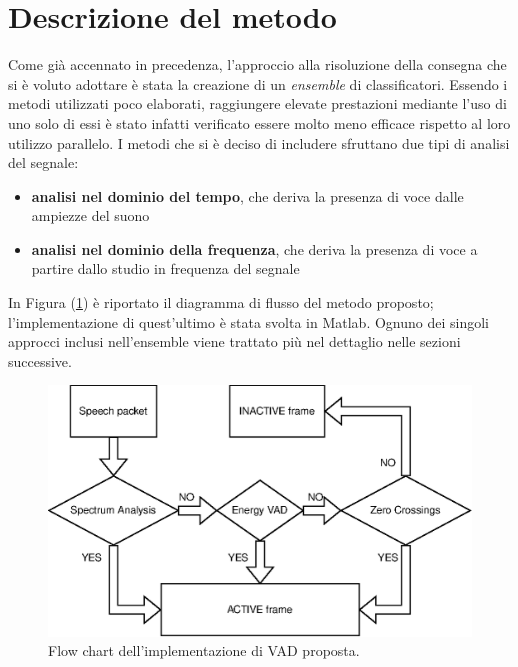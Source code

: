 \documentclass[10pt,twocolumn]{article}
\begin{document}
{\section{Descrizione del metodo}
Come già accennato in precedenza, l'approccio alla risoluzione della consegna che si è voluto adottare è stata
la creazione di un \textit{ensemble} di classificatori. Essendo i metodi utilizzati poco elaborati, raggiungere
elevate prestazioni mediante l'uso di uno solo di essi è stato infatti verificato essere molto meno efficace 
rispetto al loro utilizzo parallelo. I metodi che si è deciso di includere sfruttano due tipi di analisi del segnale:
\begin{itemize}
\item \textbf{analisi nel dominio del tempo}, che deriva la presenza di voce dalle ampiezze del suono
\item \textbf{analisi nel dominio della frequenza}, che deriva la presenza di voce a partire dallo studio in frequenza del segnale
\end{itemize}
In Figura (\ref{fig:diag}) è riportato il diagramma di flusso del metodo proposto; l'implementazione di quest'ultimo è stata svolta in Matlab. Ognuno dei singoli approcci inclusi nell'ensemble viene trattato più nel dettaglio nelle sezioni successive. 

\begin{figure}[h!]
	\centering
	\includegraphics[scale=0.65]{images/diagram.eps}
  	\caption{Flow chart dell'implementazione di VAD proposta.}
  	\label{fig:diag}
\end{figure}

}
\end{document}
